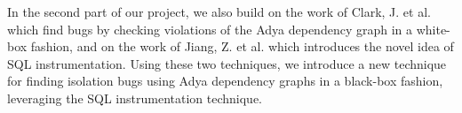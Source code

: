 In the second part of our project, we also build on the work of Clark, J. et al. \cite{clark2024validating} which find bugs by checking violations of the Adya dependency graph \cite{adya1999weak} in a white-box fashion, and on the work of Jiang, Z. et al. \cite{jiang2023detecting} which introduces the novel idea of SQL instrumentation. Using these two techniques, we introduce a new technique for finding isolation bugs using Adya dependency graphs in a black-box fashion, leveraging the SQL instrumentation technique.





